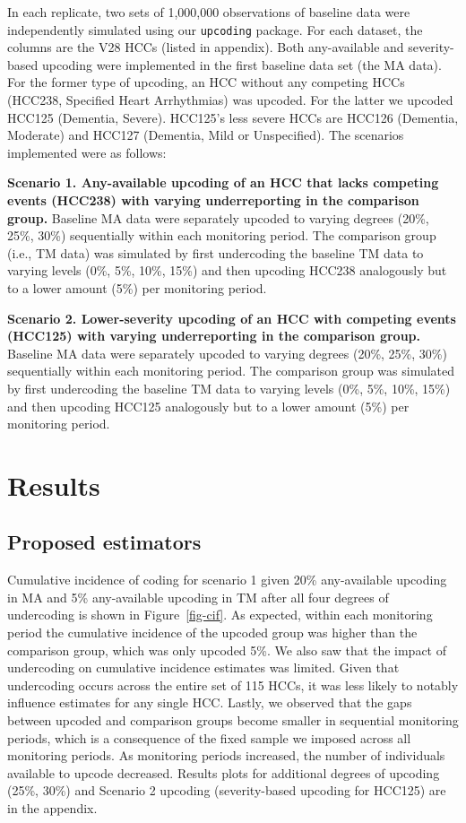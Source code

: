 \documentclass[
  12pt,
  number]{elsarticle}
\begin{document}
In each replicate, two sets of 1,000,000 observations of baseline data
were independently simulated using our \texttt{upcoding} package. For
each dataset, the columns are the V28 HCCs (listed in appendix). Both
any-available and severity-based upcoding were implemented in the first
baseline data set (the MA data). For the former type of upcoding, an HCC
without any competing HCCs (HCC238, Specified Heart Arrhythmias) was
upcoded. For the latter we upcoded HCC125 (Dementia, Severe). HCC125's
less severe HCCs are HCC126 (Dementia, Moderate) and HCC127 (Dementia,
Mild or Unspecified). The scenarios implemented were as follows:

\textbf{Scenario 1. Any-available upcoding of an HCC that lacks
competing events (HCC238) with varying underreporting in the comparison
group.} Baseline MA data were separately upcoded to varying degrees
(20\%, 25\%, 30\%) sequentially within each monitoring period. The
comparison group (i.e., TM data) was simulated by first undercoding the
baseline TM data to varying levels (0\%, 5\%, 10\%, 15\%) and then
upcoding HCC238 analogously but to a lower amount (5\%) per monitoring
period.

\textbf{Scenario 2. Lower-severity upcoding of an HCC with competing
events (HCC125) with varying underreporting in the comparison group.}
Baseline MA data were separately upcoded to varying degrees (20\%, 25\%,
30\%) sequentially within each monitoring period. The comparison group
was simulated by first undercoding the baseline TM data to varying
levels (0\%, 5\%, 10\%, 15\%) and then upcoding HCC125 analogously but
to a lower amount (5\%) per monitoring period.

\section{Results}\label{results}

\subsection{Proposed estimators}\label{proposed-estimators}

Cumulative incidence of coding for scenario 1 given 20\% any-available
upcoding in MA and 5\% any-available upcoding in TM after all four
degrees of undercoding is shown in Figure~\ref{fig-cif}. As expected,
within each monitoring period the cumulative incidence of the upcoded
group was higher than the comparison group, which was only upcoded 5\%.
We also saw that the impact of undercoding on cumulative incidence
estimates was limited. Given that undercoding occurs across the entire
set of 115 HCCs, it was less likely to notably influence estimates for
any single HCC. Lastly, we observed that the gaps between upcoded and
comparison groups become smaller in sequential monitoring periods, which
is a consequence of the fixed sample we imposed across all monitoring
periods. As monitoring periods increased, the number of individuals
available to upcode decreased. Results plots for additional degrees of
upcoding (25\%, 30\%) and Scenario 2 upcoding (severity-based upcoding
for HCC125) are in the appendix.
\end{document}
